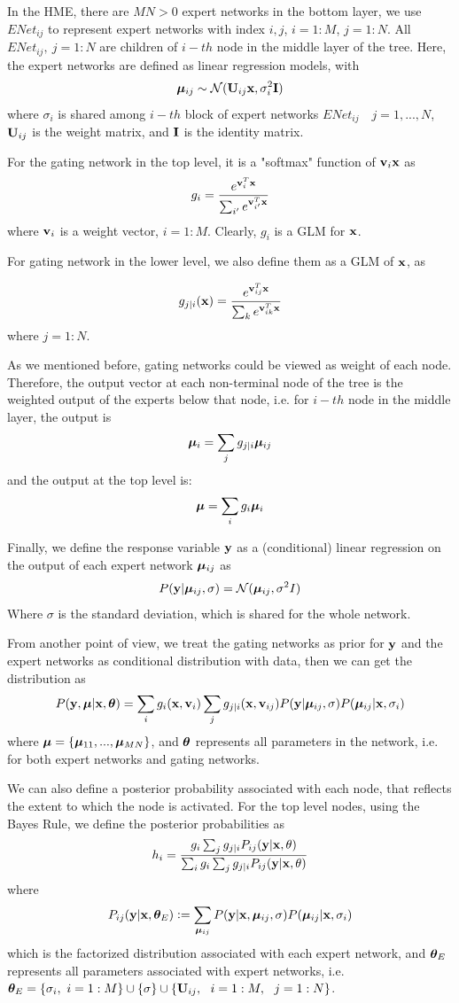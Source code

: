 In the HME, there are $MN> 0$ expert networks in the bottom layer, we use $ENet_{ij}$ to represent expert networks with index $i, j$, $i=1:M$, $j=1:N$. All $ENet_{ij},~j=1:N$ are children of $i-th$ node in the middle layer of the tree. Here, the expert networks are defined as linear regression models, with 
$$\boldsymbol \mu_{ij} \sim \mathcal{N}(\mathbf{U}_{ij}\mathbf{x}, \sigma_{i}^2\mathbf{I})$$
where $\sigma_i$ is shared among $i-th$ block of expert networks $ENet_{ij}\quad j=1,...,N$, $\mathbf{U}_{ij}$ is the weight matrix, and $\mathbf{I}$ is the identity matrix. 

For the gating network in the top level, it is a "softmax" function of $\mathbf{v}_{i}\mathbf{x}$ as
$$g_{i} = \frac{e^{\mathbf{v}_{i}^T\mathbf{x}}}{\sum_{i'}e^{\mathbf{v}_{i'}^T\mathbf{x}}}$$
where $\mathbf{v}_{i}$ is a weight vector, $i=1:M$. Clearly, $g_i$ is a GLM for $\mathbf{x}$. 

For gating network in the lower level, we also define them as a GLM of $\mathbf{x}$, as

$$g_{j|i}(\mathbf{x}) = \frac{e^{\mathbf{v}_{ij}^T\mathbf{x}}}{\sum_{k}e^{\mathbf{v}_{ik}^T\mathbf{x}}}$$
where $j=1:N$.  

As we mentioned before, gating networks could be viewed as weight of each node. Therefore, the output vector at each non-terminal node of the tree is the weighted output of the experts below that node, i.e. for $i-th$ node in the middle layer, the output is
$$\boldsymbol \mu_i = \sum_j g_{j|i}\boldsymbol \mu_{ij}$$
and the output at the top level is:
$$\boldsymbol \mu = \sum_i g_i\boldsymbol \mu_i$$


Finally, we define the response variable $\mathbf{y}$ as a (conditional) linear regression on the output of each expert network $\boldsymbol \mu_{ij}$ as 
$$P(\mathbf{y}|\boldsymbol \mu_{ij}, \sigma) = \mathcal{N}(\boldsymbol \mu_{ij}, \sigma^2I)$$ 
Where $\sigma$ is the standard deviation, which is shared for the whole network. 

From another point of view, we treat the gating networks as prior for $\mathbf{y}$ and the expert networks as conditional distribution with data, then we can get the distribution as
$$P(\mathbf{y}, \boldsymbol \mu|\mathbf{x}, \boldsymbol \theta) = \sum_{i}g_i(\mathbf{x}, \mathbf{v}_{i})\sum_{j}g_{j|i}(\mathbf{x}, \mathbf{v}_{ij})P(\mathbf{y}|\boldsymbol \mu_{ij}, \sigma)P(\boldsymbol \mu_{ij}|\mathbf{x}, \sigma_{i})$$
where $\boldsymbol \mu = \{\boldsymbol \mu_{11}, ..., \boldsymbol \mu_{MN}\}$, and $\boldsymbol \theta$ represents all parameters in the network, i.e. for both expert networks and gating networks.

We can also define a posterior probability associated with each node, that reflects the extent to which the node is activated. For the top level nodes, using the Bayes Rule, we define the posterior probabilities as 
$$h_{i} = \frac{g_{i}\sum_{j}g_{j|i}P_{ij}(\mathbf{y}|\mathbf{x}, \theta)}{\sum_{i}g_{i}\sum_{j}g_{j|i}P_{ij}(\mathbf{y}|\mathbf{x}, \theta)}$$
where $$P_{ij}(\mathbf{y}|\mathbf{x}, \boldsymbol \theta_E) \mathrel{\mathop:}= \sum_{\boldsymbol \mu_{ij}}P(\mathbf{y}|\mathbf{x}, \boldsymbol \mu_{ij}, \sigma)P(\boldsymbol \mu_{ij}|\mathbf{x}, \sigma_{i})$$
which is the factorized distribution associated with each expert network, and $\boldsymbol \theta_E$ represents all parameters associated with expert networks, i.e. $\boldsymbol \theta_E = \{\sigma_i,~i=1:M\} \cup \{\sigma\}\cup\{\mathbf{U}_{ij},~~ i=1:M, ~~j=1:N \}$.

